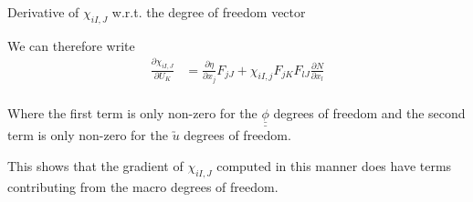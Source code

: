 \documentclass[11pt]{beamer}
\newcommand{\TEN}[1]{\underline{\underline{#1}}}
\newcommand{\VEC}[1]{\utilde{#1}}
\begin{document}
\begin{frame}{Derivative of $\chi_{iI,J}$ w.r.t. the degree of freedom vector}

We can therefore write
\begin{align*}
\frac{\partial \chi_{iI,J}}{\partial U_K} &= \frac{\partial \eta}{\partial x_j} F_{jJ} + \chi_{iI,j} F_{jK}F_{lJ} \frac{\partial N}{\partial x_l}\\
\end{align*}

Where the first term is only non-zero for the $\TEN{\phi}$ degrees of freedom and the second term is only non-zero for the $\VEC{u}$ degrees of freedom.

This shows that the gradient of $\chi_{iI,J}$ computed in this manner does have terms contributing from the macro degrees of freedom.

\end{frame}

%
%
%
%
\end{document}
